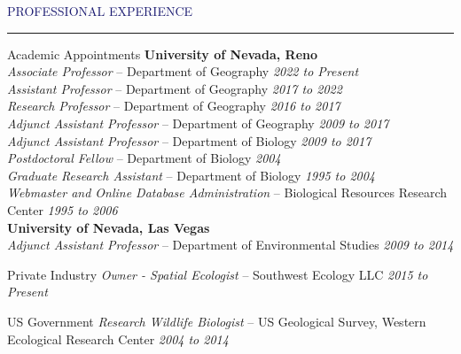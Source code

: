\documentclass{resume} %
\renewenvironment{rSection}[1]{
\sectionskip
\textcolor{MidnightBlue}{\MakeUppercase{#1}}
\sectionlineskip
\hrule
\begin{list}{}{
\setlength{\leftmargin}{1.5em}
}
\item[]
}{
\end{list}
}
\begin{document}
\begin{rSection}{Professional Experience}

  \begin{rSubsection}{Academic Appointments}{ }{ }{ }
  \vspace{-0.8em}
    \textbf{University of Nevada, Reno}\\
    \textit{Associate Professor} – Department of Geography \hfill {\em 2022 to Present}\\
    \textit{Assistant Professor} – Department of Geography \hfill {\em 2017 to 2022}\\
    \textit{Research Professor} – Department of Geography \hfill {\em 2016 to 2017}\\
    \textit{Adjunct Assistant Professor} – Department of Geography \hfill {\em 2009 to 2017}\\
    \textit{Adjunct Assistant Professor} – Department of Biology \hfill {\em 2009 to 2017}\\
    \textit{Postdoctoral Fellow} – Department of Biology \hfill {\em 2004}\\
    \textit{Graduate Research Assistant} – Department of Biology \hfill {\em 1995 to 2004}\\
    \textit{Webmaster and Online Database Administration} – Biological Resources Research Center \hfill {\em 1995 to 2006}\\
    \textbf{University of Nevada, Las Vegas}\\
    \textit{Adjunct Assistant Professor} – Department of Environmental Studies \hfill {\em 2009 to 2014}
  \end{rSubsection}

  \begin{rSubsection}{Private Industry}{ }{ }{ }
  \vspace{-0.8em}
    \textit{Owner - Spatial Ecologist} – Southwest Ecology LLC \hfill {\em 2015 to Present}
  \end{rSubsection}

  \begin{rSubsection}{US Government}{ }{ }{ }
  \vspace{-0.8em}
    \textit{Research Wildlife Biologist} – US Geological Survey, Western Ecological Research Center \hfill {\em 2004 to 2014}
  \end{rSubsection}

\end{rSection}
\end{document}
